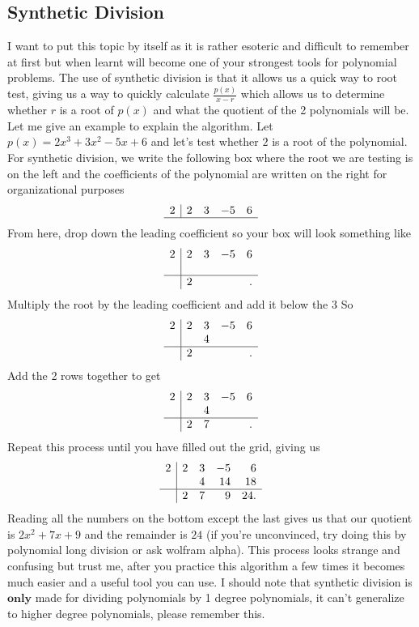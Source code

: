 \documentclass[11pt]{article}
\begin{document}
\subsection{Synthetic Division}
I want to put this topic by itself as it is rather esoteric and difficult to remember at first but when learnt will become one of your strongest tools for polynomial problems. The use of synthetic division is that it allows us a quick way to root test, giving us a way to quickly calculate $\frac{p(x)}{x-r}$ which allows us to determine whether $r$ is a root of $p(x)$ and what the quotient of the 2 polynomials will be. Let me give an example to explain the algorithm. Let $p(x) = 2x^3+3x^2-5x+6$ and let's test whether $2$ is a root of the polynomial. For synthetic division, we write the following box where the root we are testing is on the left and the coefficients of the polynomial are written on the right for organizational purposes
\[
\begin{array}{r|rrrr}
2 & 2 & 3 & -5 & 6 \\
\hline
\end{array}
\]
From here, drop down the leading coefficient so your box will look something like 
\[
\begin{array}{r|rrrr}
2 & 2 & 3 & -5 & 6 \\
  &   &  &  & \\
\hline
 & 2 & & & .\\
\end{array}
\]
Multiply the root by the leading coefficient and add it below the 3 So
\[
\begin{array}{r|rrrr}
2 & 2 & 3 & -5 & 6 \\
  &   & 4 &  & \\
\hline
 & 2 & & & .\\
\end{array}
\] 
Add the 2 rows together to get 
\[
\begin{array}{r|rrrr}
2 & 2 & 3 & -5 & 6 \\
  &   & 4 &  & \\
\hline
 & 2 & 7 & & .\\
\end{array}
\] 
Repeat this process until you have filled out the grid, giving us
\[
\begin{array}{r|rrrr}
2 & 2 & 3 & -5 & 6 \\
  &   & 4 & 14 & 18 \\
\hline
 & 2 & 7 & 9 & 24 .\\
\end{array}
\] 
Reading all the numbers on the bottom except the last gives us that our quotient is $2x^2+7x+9$ and the remainder is $24$ (if you're unconvinced, try doing this by polynomial long division or ask wolfram alpha). This process looks strange and confusing but trust me, after you practice this algorithm a few times it becomes much easier and a useful tool you can use. I should note that synthetic division is $\textbf{only}$ made for dividing polynomials by 1 degree polynomials, it can't generalize to higher degree polynomials, please remember this. 
\end{document}
